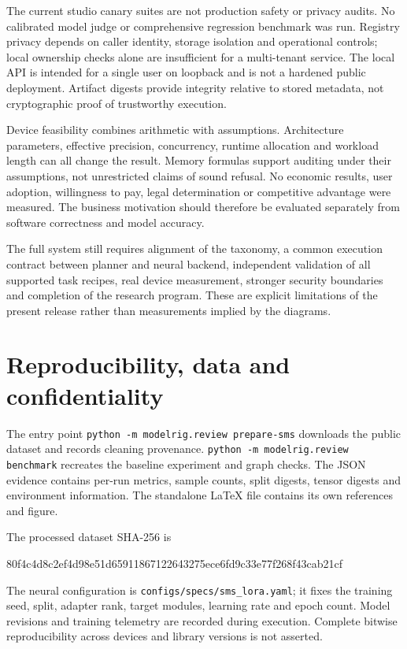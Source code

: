 \documentclass[11pt,a4paper]{article}
\newcommand{\code}[1]{\texttt{#1}}
\begin{document}
The current studio canary suites are not production safety or privacy audits.
No calibrated model judge or comprehensive regression benchmark was run. Registry
privacy depends on caller identity, storage isolation and operational controls;
local ownership checks alone are insufficient for a multi-tenant service. The
local API is intended for a single user on loopback and is not a hardened public
deployment. Artifact digests provide integrity relative to stored metadata,
not cryptographic proof of trustworthy execution.

Device feasibility combines arithmetic with assumptions. Architecture parameters,
effective precision, concurrency, runtime allocation and workload length can
all change the result. Memory formulas support auditing under their assumptions,
not unrestricted claims of sound refusal. No economic results, user adoption,
willingness to pay, legal determination or competitive advantage were measured.
The business motivation should therefore be evaluated separately from software
correctness and model accuracy.

The full system still requires alignment of the taxonomy, a common execution
contract between planner and neural backend, independent validation of all
supported task recipes, real device measurement, stronger security boundaries
and completion of the research program. These are explicit limitations of the
present release rather than measurements implied by the diagrams.

\section{Reproducibility, data and confidentiality}
The entry point \code{python -m modelrig.review prepare-sms} downloads the public
dataset and records cleaning provenance. \code{python -m modelrig.review benchmark}
recreates the baseline experiment and graph checks. The JSON evidence contains
per-run metrics, sample counts, split digests, tensor digests and environment
information. The standalone LaTeX file contains its own references and figure.

The processed dataset SHA-256 is
\begin{center}\small\ttfamily
80f4c4d8c2ef4d98e51d65911867122643275ece6fd9c33e77f268f43cab21cf
\end{center}
The neural configuration is \code{configs/specs/sms\_lora.yaml}; it fixes the
training seed, split, adapter rank, target modules, learning rate and epoch count.
Model revisions and training telemetry are recorded during execution. Complete
bitwise reproducibility across devices and library versions is not asserted.
\end{document}
